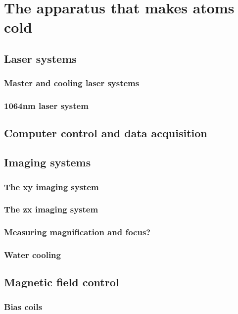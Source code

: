 

\renewcommand{\thechapter}{3}

\chapter{The apparatus that makes atoms cold}



\section{Laser systems}
\subsection{Master and cooling laser systems}
\subsection{1064nm laser system}
\section{Computer control and data acquisition
}
\section{Imaging systems}
\subsection{The xy imaging system}
\subsection{The zx imaging system}
\subsection{Measuring magnification and focus?}

\subsection{Water cooling}

\section{Magnetic field control}
\subsection{Bias coils}
